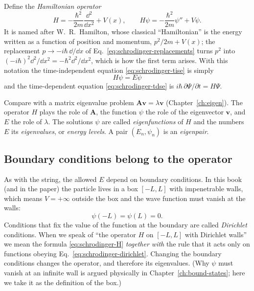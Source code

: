 Define the \emph{Hamiltonian operator}
\begin{equation}
H=-\frac{\hbar^2}{2m}\frac{\dd^2}{\dd x^2}+V(x),
\qquad
H\psi=-\frac{\hbar^2}{2m}\psi''+V\psi.
\label{eq:schrodinger-H}
\end{equation}
It is named after W.~R.~Hamilton, whose classical ``Hamiltonian'' is the energy written as a function of position and momentum, $p^2/2m+V(x)$; the replacement $p\to-i\hbar\,\dd/\dd x$ of Eq.~\eqref{eq:schrodinger-replacements} turns $p^2$ into $(-i\hbar)^2\dd^2/\dd x^2=-\hbar^2\dd^2/\dd x^2$, which is how the first term arises. With this notation the time-independent equation \eqref{eq:schrodinger-tise} is simply
\begin{equation}
\boxed{\;H\psi=E\psi\;}
\label{eq:schrodinger-eigen}
\end{equation}
and the time-dependent equation \eqref{eq:schrodinger-tdse} is $i\hbar\,\partial\Psi/\partial t=H\Psi$.

Compare with a matrix eigenvalue problem $\mathbf{A}\mathbf{v}=\lambda\mathbf{v}$ (Chapter~\ref{ch:eigen}). The operator $H$ plays the role of $\mathbf{A}$, the function $\psi$ the role of the eigenvector $\mathbf{v}$, and $E$ the role of $\lambda$. The solutions $\psi$ are called \emph{eigenfunctions} of $H$ and the numbers $E$ its \emph{eigenvalues}, or \emph{energy levels}. A pair $(E_n,\psi_n)$ is an \emph{eigenpair}.

\subsection{Boundary conditions belong to the operator}

As with the string, the allowed $E$ depend on boundary conditions. In this book (and in the paper) the particle lives in a box $[-L,L]$ with impenetrable walls, which means $V=+\infty$ outside the box and the wave function must vanish at the walls:
\begin{equation}
\psi(-L)=\psi(L)=0.
\label{eq:schrodinger-dirichlet}
\end{equation}
Conditions that fix the value of the function at the boundary are called \emph{Dirichlet} conditions. When we speak of ``the operator $H$ on $[-L,L]$ with Dirichlet walls'' we mean the formula \eqref{eq:schrodinger-H} \emph{together with} the rule that it acts only on functions obeying Eq.~\eqref{eq:schrodinger-dirichlet}. Changing the boundary conditions changes the operator, and therefore its eigenvalues. (Why $\psi$ must vanish at an infinite wall is argued physically in Chapter~\ref{ch:bound-states}; here we take it as the definition of the box.)

